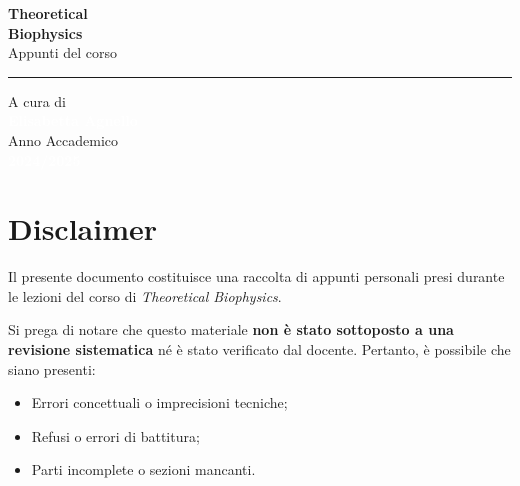 \documentclass[12pt, a4paper]{book}
\begin{document}
\begin{titlepage}
\begin{flushleft}
        \vspace{4.5cm}
        
        \textcolor{colorE}{\sffamily\fontsize{60}{70}\selectfont\textbf{Theoretical}}\\[0.1cm]
        \textcolor{colorE}{\sffamily\fontsize{60}{70}\selectfont\textbf{Biophysics}}\\[0.6cm]
        \textcolor{white!80}{\sffamily\Large Appunti del corso}\\[0.5cm]
        \textcolor{white!30}{\rule{6cm}{1pt}} %
    \end{flushleft}
    
    \vfill %
    
    \begin{flushleft}
        \textcolor{white!60}{\sffamily\large A cura di}\\[0.2cm]
        \textcolor{white}{\sffamily\huge\textbf{Elisabetta Agnello}}\\[1.2cm]
        
        \textcolor{white!60}{\sffamily\large Anno Accademico}\\[0.2cm]
        \textcolor{white}{\sffamily\Large\textbf{2024/2025}}
    \end{flushleft}
    
    \vspace*{1cm} %
\end{titlepage}
    


\frontmatter %

\chapter*{Disclaimer}
\thispagestyle{empty} %

Il presente documento costituisce una raccolta di appunti personali presi durante le lezioni del corso di \textit{Theoretical Biophysics}. 

Si prega di notare che questo materiale \textbf{non è stato sottoposto a una revisione sistematica} né è stato verificato dal docente. Pertanto, è possibile che siano presenti:
\begin{itemize}
    \item Errori concettuali o imprecisioni tecniche;
    \item Refusi o errori di battitura;
    \item Parti incomplete o sezioni mancanti.
\end{itemize}
\end{document}
